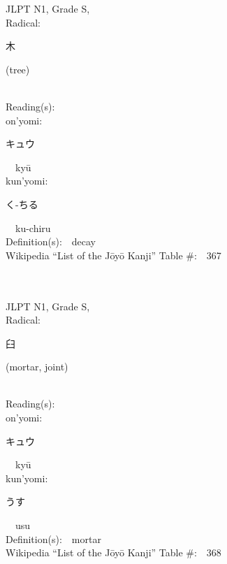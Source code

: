 \begin{multicols}{2}
{JLPT N1, Grade S, \\Radical:\ \ {\begin{CJK}{UTF8}{min} 木 \end{CJK}} (tree) } \\
Reading(s):\ \ \\
{\hspace*{1em}}on'yomi:\ \ \\
{\hspace*{2em}}{\begin{CJK}{UTF8}{min} キュウ \end{CJK}}\ \ ky\=u\ \ \\
{\hspace*{1em}}kun'yomi:\ \ \\
{\hspace*{2em}}{\begin{CJK}{UTF8}{min} く-ちる \end{CJK}}\ \ ku-chiru\ \ \\
Definition(s):\ \ decay \\
Wikipedia ``List of the J\=oy\=o Kanji'' Table \#:\ \ 367 \\
\ \ \\
{\fontsize{34pt}{40pt}  }\ \ \\
{JLPT N1, Grade S, \\Radical:\ \ {\begin{CJK}{UTF8}{min} 臼 \end{CJK}} (mortar, joint) } \\
Reading(s):\ \ \\
{\hspace*{1em}}on'yomi:\ \ \\
{\hspace*{2em}}{\begin{CJK}{UTF8}{min} キュウ \end{CJK}}\ \ ky\=u\ \ \\
{\hspace*{1em}}kun'yomi:\ \ \\
{\hspace*{2em}}{\begin{CJK}{UTF8}{min} うす \end{CJK}}\ \ usu\ \ \\
Definition(s):\ \ mortar \\
Wikipedia ``List of the J\=oy\=o Kanji'' Table \#:\ \ 368 \\
\ \ \\

\end{multicols}
